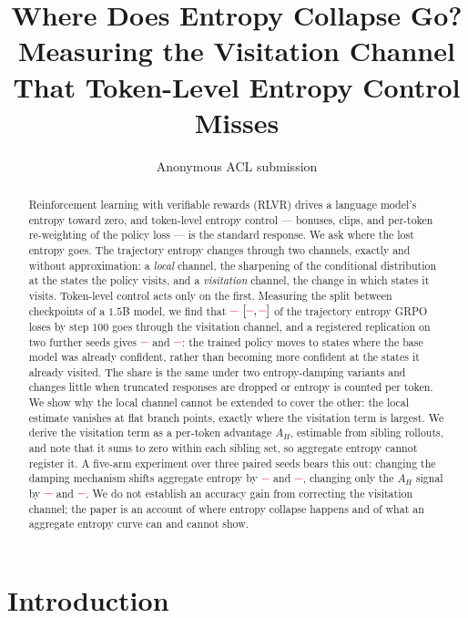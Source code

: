 \documentclass[11pt]{article}
\title{Where Does Entropy Collapse Go?\\
Measuring the Visitation Channel That Token-Level Entropy Control Misses}
\author{Anonymous ACL submission}
\newcommand{\AH}{A_{H}}
\providecommand{\PENDING}{\textcolor{red}{\textbf{--}}}
\newcommand{\num}[1]{\ifcsname #1\endcsname\csname #1\endcsname\else\PENDING\fi}
\begin{document}
\maketitle

\begin{abstract}
Reinforcement learning with verifiable rewards (RLVR) drives a language model's
entropy toward zero, and token-level entropy control --- bonuses, clips, and per-token
re-weighting of the policy loss --- is the standard response. We ask where the lost
entropy goes. The trajectory entropy changes through two channels, exactly and without
approximation: a \emph{local} channel, the sharpening of the conditional distribution
at the states the policy visits, and a \emph{visitation} channel, the change in which
states it visits. Token-level control acts only on the first. Measuring the split
between checkpoints of a $1.5$B model, we find that $\num{DecGrpoShare}$
$[\num{DecGrpoShareLo}, \num{DecGrpoShareHi}]$ of the trajectory entropy GRPO loses by
step $100$ goes through the visitation channel, and a registered replication on two
further seeds gives $\num{DecRepGrpoShare}$ and $\num{DecRepSignedShare}$: the trained
policy moves to states where the base model was already confident, rather than
becoming more confident at the states it already visited. The share is the same under
two entropy-damping variants and changes little when truncated responses are dropped
or entropy is counted per token. We show why the local channel cannot be extended to
cover the other: the local estimate vanishes at flat branch points, exactly where the
visitation term is largest. We derive the visitation term as a per-token advantage
$\AH$, estimable from sibling rollouts, and note that it sums to zero within each
sibling set, so aggregate entropy cannot register it. A five-arm experiment over three
paired seeds bears this out: changing the damping mechanism shifts aggregate entropy
by $\num{Csteergrpoentropy}$ and $\num{Cuniformsteerentropy}$, changing only the $\AH$
signal by $\num{Csigneduniformentropy}$ and $\num{Csignedpermutedentropy}$. We do not
establish an accuracy gain from correcting the visitation channel; the paper is an
account of where entropy collapse happens and of what an aggregate entropy curve can
and cannot show.
\end{abstract}

\section{Introduction}
\label{sec:intro}
\end{document}
